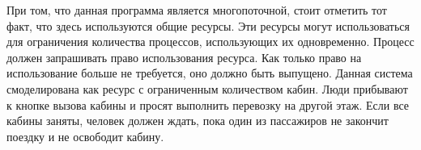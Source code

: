 	При том, что данная программа является многопоточной, стоит отметить тот факт, что здесь используются общие ресурсы.
		Эти ресурсы могут использоваться для ограничения количества процессов, использующих их одновременно.
		Процесс должен запрашивать право использования ресурса. Как только право на использование больше не требуется,
		оно должно быть выпущено. Данная система смоделирована как ресурс с ограниченным количеством кабин.
		Люди прибывают к кнопке вызова кабины и просят выполнить перевозку на другой этаж.
		Если все кабины заняты, человек должен ждать, пока один из пассажиров не закончит поездку и не освободит кабину.
